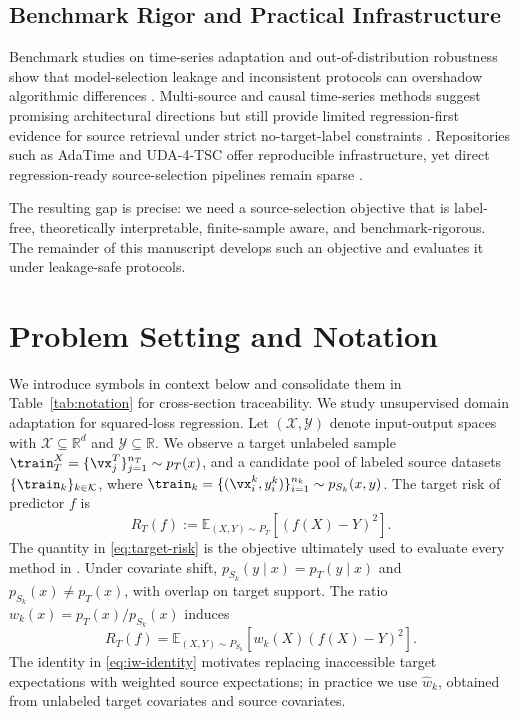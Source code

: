 \documentclass{article} %
\begin{document}
\subsection{Benchmark Rigor and Practical Infrastructure}
Benchmark studies on time-series adaptation and out-of-distribution robustness show that model-selection leakage and inconsistent protocols can overshadow algorithmic differences \citep{Ragab2023AdaTime,Fawaz2023Benchmark,Koh2021WILDS,Zhao2023TTAPitfalls}. Multi-source and causal time-series methods suggest promising architectural directions but still provide limited regression-first evidence for source retrieval under strict no-target-label constraints \citep{Lu2024CauDiTS,Stojanov2023CALDA,Wang2024POND,He2023Raincoat,Yang2025SourceFreeTSDA}. Repositories such as AdaTime and UDA-4-TSC offer reproducible infrastructure, yet direct regression-ready source-selection pipelines remain sparse \citep{AdaTimeRepo2022,UDA4TSCRepo2023,WildsRepo2021,Guo2018MoE,Cui2020MultiSourceAttention}.

The resulting gap is precise: we need a source-selection objective that is label-free, theoretically interpretable, finite-sample aware, and benchmark-rigorous. The remainder of this manuscript develops such an objective and evaluates it under leakage-safe protocols.

\section{Problem Setting and Notation}
We introduce symbols in context below and consolidate them in Table~\ref{tab:notation} for cross-section traceability.
We study unsupervised domain adaptation for squared-loss regression. Let \((\mathcal{X},\mathcal{Y})\) denote input-output spaces with \(\mathcal{X}\subseteq \mathbb{R}^d\) and \(\mathcal{Y}\subseteq \mathbb{R}\). We observe a target unlabeled sample \(\train_T^X=\{\vx_j^T\}_{j=1}^{n_T}\sim p_T(x)\), and a candidate pool of labeled source datasets
\(\{\train_k\}_{k\in\mathcal{K}}\), where
\(\train_k=\{(\vx_i^k,y_i^k)\}_{i=1}^{n_k}\sim p_{S_k}(x,y)\).
The target risk of predictor \(f\) is
\begin{equation}
R_T(f) := \mathbb{E}_{(X,Y)\sim P_T}\left[(f(X)-Y)^2\right].
\label{eq:target-risk}
\end{equation}
The quantity in \eqref{eq:target-risk} is the objective ultimately used to evaluate every method in .
Under covariate shift, \(p_{S_k}(y\mid x)=p_T(y\mid x)\) and \(p_{S_k}(x)\neq p_T(x)\), with overlap on target support. The ratio \(w_k(x)=p_T(x)/p_{S_k}(x)\) induces
\begin{equation}
R_T(f) = \mathbb{E}_{(X,Y)\sim P_{S_k}}\left[w_k(X)(f(X)-Y)^2\right].
\label{eq:iw-identity}
\end{equation}
The identity in \eqref{eq:iw-identity} motivates replacing inaccessible target expectations with weighted source expectations; in practice we use \(\hat w_k\), obtained from unlabeled target covariates and source covariates.
\end{document}
